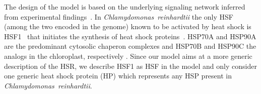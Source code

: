 \documentclass[oneside, 10pt, a4paper, twocolumn]{article}
\begin{document}
The design of the model is based on the underlying signaling network
inferred from experimental findings~\cite{Schmollinger2013}.
In \emph{Chlamydomonas~reinhardtii} the only HSF (among the two encoded in the genome) known to be activated 
by heat shock is HSF1~\cite{Schulz-Raffelt2007} that initiates the synthesis of heat shock proteins~\cite{Schroda2004}. HSP70A and HSP90A are the predominant cytosolic chaperon complexes and HSP70B and HSP90C the analogs in the chloroplast, respectively \cite{Wilmund2005}.
Since our model aims at a more generic description of the HSR, we describe HSF1 as  HSF in the model and only consider one generic heat shock protein (HP)
which represents any HSP present in \emph{Chlamydomonas~reinhardtii}. 



\end{document}
